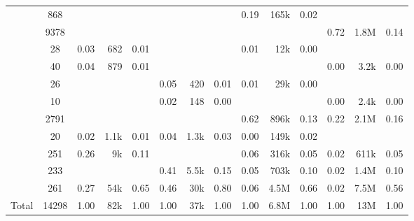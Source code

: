 \documentclass[
]{article}
\begin{document}
\begin{table}
\begin{tabular}[t]{rcrrcrrcrrcrrr}
 & 868 & \cellcolor{gray}{  } & \cellcolor{gray}{  } & \cellcolor{gray}{  } & \cellcolor{gray}{  } & \cellcolor{gray}{  } & \cellcolor{gray}{  } & 0.19 & 165k & 0.02 & \cellcolor{gray}{  } & \cellcolor{gray}{  } & \cellcolor{gray}{  }\\
 & 9378 & \cellcolor{gray}{  } & \cellcolor{gray}{  } & \cellcolor{gray}{  } & \cellcolor{gray}{  } & \cellcolor{gray}{  } & \cellcolor{gray}{  } & \cellcolor{gray}{  } & \cellcolor{gray}{  } & \cellcolor{gray}{  } & 0.72 & 1.8M & 0.14\\
\addlinespace
 & 28 & 0.03 & 682 & 0.01 & \cellcolor{gray}{  } & \cellcolor{gray}{  } & \cellcolor{gray}{  } & 0.01 & 12k & 0.00 & \cellcolor{gray}{  } & \cellcolor{gray}{  } & \cellcolor{gray}{  }\\
 & 40 & 0.04 & 879 & 0.01 & \cellcolor{gray}{  } & \cellcolor{gray}{  } & \cellcolor{gray}{  } & \cellcolor{gray}{  } & \cellcolor{gray}{  } & \cellcolor{gray}{  } & 0.00 & 3.2k & 0.00\\
 & 26 & \cellcolor{gray}{  } & \cellcolor{gray}{  } & \cellcolor{gray}{  } & 0.05 & 420 & 0.01 & 0.01 & 29k & 0.00 & \cellcolor{gray}{  } & \cellcolor{gray}{  } & \cellcolor{gray}{  }\\
 & 10 & \cellcolor{gray}{  } & \cellcolor{gray}{  } & \cellcolor{gray}{  } & 0.02 & 148 & 0.00 & \cellcolor{gray}{  } & \cellcolor{gray}{  } & \cellcolor{gray}{  } & 0.00 & 2.4k & 0.00\\
 & 2791 & \cellcolor{gray}{  } & \cellcolor{gray}{  } & \cellcolor{gray}{  } & \cellcolor{gray}{  } & \cellcolor{gray}{  } & \cellcolor{gray}{  } & 0.62 & 896k & 0.13 & 0.22 & 2.1M & 0.16\\
\addlinespace
 & 20 & 0.02 & 1.1k & 0.01 & 0.04 & 1.3k & 0.03 & 0.00 & 149k & 0.02 & \cellcolor{gray}{  } & \cellcolor{gray}{  } & \cellcolor{gray}{  }\\
 & 251 & 0.26 & 9k & 0.11 & \cellcolor{gray}{  } & \cellcolor{gray}{  } & \cellcolor{gray}{  } & 0.06 & 316k & 0.05 & 0.02 & 611k & 0.05\\
 & 233 & \cellcolor{gray}{  } & \cellcolor{gray}{  } & \cellcolor{gray}{  } & 0.41 & 5.5k & 0.15 & 0.05 & 703k & 0.10 & 0.02 & 1.4M & 0.10\\
\addlinespace
 & 261 & 0.27 & 54k & 0.65 & 0.46 & 30k & 0.80 & 0.06 & 4.5M & 0.66 & 0.02 & 7.5M & 0.56\\
\midrule
Total & 14298 & 1.00 & 82k & 1.00 & 1.00 & 37k & 1.00 & 1.00 & 6.8M & 1.00 & 1.00 & 13M & 1.00\\
\bottomrule
\end{tabular}
\end{table}
\end{document}

